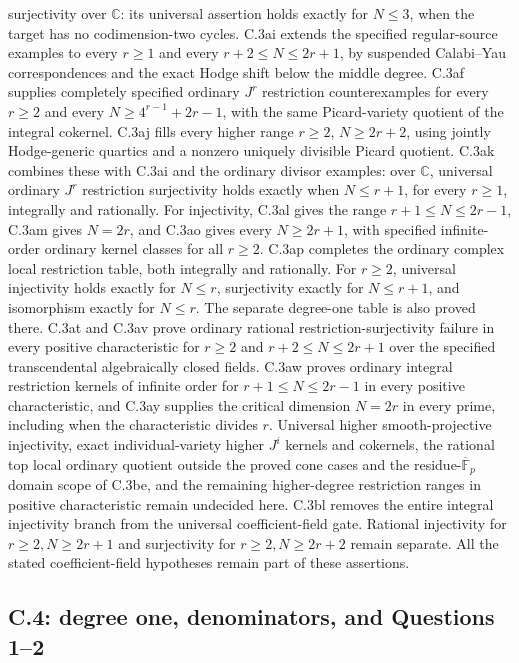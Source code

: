 surjectivity over $\mathbb C$: its universal assertion
holds exactly for $N\le3$, when the target has no
codimension-two cycles.
C.3ai extends the specified regular-source examples to every
$r\ge1$ and every $r+2\le N\le2r+1$, by suspended
Calabi--Yau correspondences and the exact Hodge shift below
the middle degree.
C.3af supplies completely specified ordinary $J^r$
restriction counterexamples for every $r\ge2$ and every
$N\ge4^{r-1}+2r-1$, with the same Picard-variety quotient
of the integral cokernel. C.3aj fills every higher range
$r\ge2$, $N\ge2r+2$, using jointly Hodge-generic quartics
and a nonzero uniquely divisible Picard quotient.
C.3ak combines these with C.3ai and the ordinary divisor
examples: over $\mathbb C$, universal ordinary $J^r$
restriction surjectivity holds exactly when $N\le r+1$,
for every $r\ge1$, integrally and rationally.
For injectivity, C.3al gives the range
$r+1\le N\le2r-1$, C.3am gives $N=2r$, and C.3ao gives
every $N\ge2r+1$, with specified infinite-order ordinary
kernel classes for all $r\ge2$. C.3ap completes the
ordinary complex local restriction table, both integrally
and rationally. For $r\ge2$, universal injectivity holds
exactly for $N\le r$, surjectivity exactly for $N\le r+1$,
and isomorphism exactly for $N\le r$. The separate
degree-one table is also proved there.
C.3at and C.3av prove ordinary rational restriction-surjectivity
failure in every positive characteristic for
$r\ge2$ and $r+2\le N\le2r+1$ over the specified
transcendental algebraically closed fields. C.3aw proves
ordinary integral restriction kernels of infinite order for
$r+1\le N\le2r-1$ in every positive characteristic, and
C.3ay supplies the critical dimension $N=2r$ in every prime,
including when the characteristic divides $r$.
Universal higher smooth-projective injectivity, exact
individual-variety higher $J^i$ kernels and cokernels,
the rational top local ordinary quotient outside the proved
cone cases and the residue-$\overline{\mathbb F}_p$ domain scope
of C.3be, and the remaining higher-degree restriction ranges
in positive characteristic remain undecided here. C.3bl removes
the entire integral injectivity branch from the universal
coefficient-field gate. Rational injectivity for $r\ge2,N\ge2r+1$
and surjectivity for
$r\ge2,N\ge2r+2$ remain separate. All the stated
coefficient-field hypotheses remain
part of these assertions.

\subsection{C.4: degree one, denominators, and Questions 1--2}


